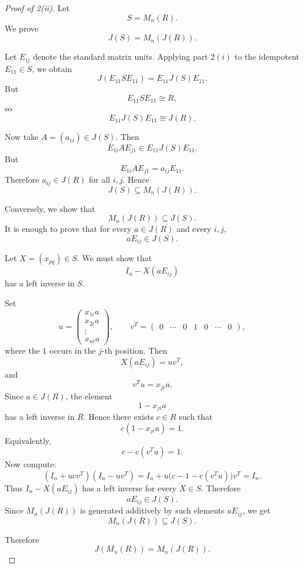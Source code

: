         \begin{proof}[Proof of 2(ii)]
        Let
        \[
            S=M_n(R).
        \]
        We prove
        \[
            J(S)=M_n(J(R)).
        \]
        
        Let \(E_{ij}\) denote the standard matrix units. Applying part \(2(i)\) to the
        idempotent \(E_{11}\in S\), we obtain
        \[
            J(E_{11}SE_{11})=E_{11}J(S)E_{11}.
        \]
        But
        \[
            E_{11}SE_{11}\cong R,
        \]
        so
        \[
            E_{11}J(S)E_{11}\cong J(R).
        \]
        
        Now take \(A=(a_{ij})\in J(S)\). Then
        \[
            E_{1i}AE_{j1}\in E_{11}J(S)E_{11}.
        \]
        But
        \[
            E_{1i}AE_{j1}=a_{ij}E_{11}.
        \]
        Therefore \(a_{ij}\in J(R)\) for all \(i,j\). Hence
        \[
            J(S)\subseteq M_n(J(R)).
        \]
        
        Conversely, we show that
        \[
            M_n(J(R))\subseteq J(S).
        \]
        It is enough to prove that for every \(a\in J(R)\) and every \(i,j\),
        \[
            aE_{ij}\in J(S).
        \]
        
        Let \(X=(x_{pq})\in S\). We must show that
        \[
            I_n-X(aE_{ij})
        \]
        has a left inverse in \(S\).
        
        Set
        \[
            u=
            \begin{pmatrix}
                x_{1i}a\\
                x_{2i}a\\
                \vdots\\
                x_{ni}a
            \end{pmatrix},
            \qquad
            v^{T}=
            \begin{pmatrix}
                0&\cdots&0&1&0&\cdots&0
            \end{pmatrix},
        \]
        where the \(1\) occurs in the \(j\)-th position. Then
        \[
            X(aE_{ij})=uv^{T},
        \]
        and
        \[
            v^{T}u=x_{ji}a.
        \]
        Since \(a\in J(R)\), the element
        \[
            1-x_{ji}a
        \]
        has a left inverse in \(R\). Hence there exists \(c\in R\) such that
        \[
            c(1-x_{ji}a)=1.
        \]
        Equivalently,
        \[
            c-c(v^{T}u)=1.
        \]
        Now compute:
        \[
            (I_n+ucv^{T})(I_n-uv^{T})
            =
            I_n+u\bigl(c-1-c(v^{T}u)\bigr)v^{T}
            =
            I_n.
        \]
        Thus \(I_n-X(aE_{ij})\) has a left inverse for every \(X\in S\). Therefore
        \[
            aE_{ij}\in J(S).
        \]
        Since \(M_n(J(R))\) is generated additively by such elements \(aE_{ij}\), we get
        \[
            M_n(J(R))\subseteq J(S).
        \]
        
        Therefore
        \[
            J(M_n(R))=M_n(J(R)).
        \]
        \end{proof}
        
